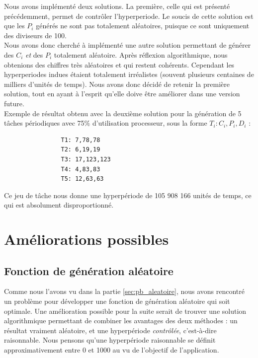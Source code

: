 			Nous avons implémenté deux solutions. La première, celle qui est présenté précédemment, permet de contrôler l'hyperperiode. Le soucis de cette solution est que les $P_i$ générés ne sont pas totalement aléatoires, puisque ce sont uniquement des diviseurs de 100.\\
		
			Nous avons donc cherché à implémenté une autre solution permettant de générer des $C_i$ \emph{et} des $P_i$ totalement aléatoire. Après réflexion algorithmique, nous obtenions des chiffres très aléatoires et qui restent cohérents. Cependant les hyperperiodes indues étaient totalement irréalistes (souvent plusieurs centaines de milliers d'unités de temps). Nous avons donc décidé de retenir la première solution, tout en ayant à l'esprit qu'elle doive être améliorer dans une version future.\\
			
			Exemple de résultat obtenu avec la deuxième solution pour la génération de 5 tâches périodiques avec 75\% d'utilisation processeur, sous la forme $T_i: C_i,P_i,D_i$ :
			\begin{lstlisting}
				T1: 7,78,78
				T2: 6,19,19
				T3: 17,123,123
				T4: 4,83,83
				T5: 12,63,63
			\end{lstlisting}
			Ce jeu de tâche nous donne une hyperpériode de 105 908 166 unités de temps, ce qui est absolument disproportionné.
	
	\section{Améliorations possibles}
		\subsection{Fonction de génération aléatoire}
			Comme nous l'avons vu dans la partie \ref{sec:pb_aleatoire}, nous avons rencontré un problème pour développer une fonction de génération aléatoire qui soit optimale. Une amélioration possible pour la suite serait de trouver une solution algorithmique permettant de combiner les avantages des deux méthodes : un résultat vraiment aléatoire, et une hyperpériode \emph{contrôlée}, c'est-à-dire raisonnable. Nous pensons qu'une hyperpériode raisonnable se définit approximativement entre 0 et 1000 au vu de l'objectif de l'application.
			
